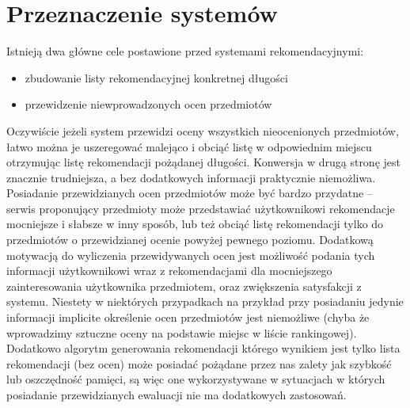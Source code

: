 \documentclass{pracamgr}
\begin{document}
  \section{Przeznaczenie systemów}
   Istnieją dwa główne cele postawione przed systemami rekomendacyjnymi:
   \begin{itemize}\itemsep1pt \parskip0pt 
    \item zbudowanie listy rekomendacyjnej konkretnej długości
    \item przewidzenie niewprowadzonych ocen przedmiotów
   \end{itemize}
   Oczywiście jeżeli system przewidzi oceny wszystkich nieocenionych przedmiotów,
   łatwo można je uszeregować malejąco i obciąć listę w odpowiednim miejscu otrzymując listę rekomendacji pożądanej długości.\newline
   Konwersja w drugą stronę jest znacznie trudniejsza, a bez dodatkowych informacji praktycznie niemożliwa.\newline
   Posiadanie przewidzianych ocen przedmiotów może być bardzo przydatne -- serwis proponujący przedmioty może przedstawiać użytkownikowi
   rekomendacje mocniejsze i słabsze w inny sposób, lub też obciąć listę rekomendacji tylko do przedmiotów o przewidzianej ocenie powyżej pewnego poziomu.
   Dodatkową motywacją do wyliczenia przewidywanych ocen jest możliwość podania tych informacji użytkownikowi wraz z rekomendacjami
   dla mocniejszego zainteresowania użytkownika przedmiotem, oraz zwiększenia satysfakcji z systemu.\newline
   Niestety w niektórych przypadkach na przykład przy posiadaniu jedynie informacji implicite określenie ocen przedmiotów jest niemożliwe
   (chyba że wprowadzimy sztuczne oceny na podstawie miejsc w liście rankingowej). Dodatkowo algorytm generowania rekomendacji którego wynikiem
   jest tylko lista rekomendacji (bez ocen) może posiadać pożądane przez nas zalety jak szybkość lub oszczędność pamięci,
   są więc one wykorzystywane w sytuacjach w których posiadanie przewidzianych ewaluacji nie ma dodatkowych zastosowań.
   
   
   
\end{document}
